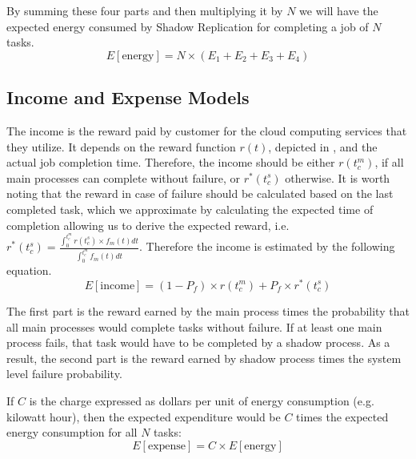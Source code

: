 

By summing these four parts and then multiplying it by $N$ we will have
the expected energy consumed by Shadow Replication for completing a
job of $N$ tasks.
\begin{equation}
E[\text{energy}]=N \times (E_1 + E_2 + E_3 + E_4)
\label{eq:total_energy}
\end{equation}

\subsection{Income and Expense Models}
The income is the reward paid by customer for the cloud computing
services that they utilize. It depends on the reward function $r(t)$,
depicted in , and the actual job completion
time. Therefore, the income should be either $r(t_c^m)$, if all main
processes can complete without failure, or $r^*(t_c^s)$ otherwise. It
is worth noting that the reward in case of failure should be
calculated based on the last completed task, which we approximate by
calculating the expected time of completion allowing us to derive the
expected reward, i.e. $r^*(t_c^s)=\frac{\int_0^{t_c^m}r(t_c^s) \times
f_m(t)dt}{\int_0^{t_c^m}f_m(t)dt}$. Therefore the income is estimated
by the following equation.
\begin{equation}
E[\text{income}]= (1-P_f) \times r(t_c^m) + P_f \times r^*(t_c^s)
\end{equation}


The first part is the reward earned by the main process times the
probability that all main processes would complete tasks without
failure. If at least one main process fails, that task would have to
be completed by a shadow process. As a result, the second part is the
reward earned by shadow process times the system level failure probability.

If $C$ is the charge expressed as dollars per unit of energy consumption
(e.g. kilowatt hour), then the expected expenditure would be $C$ times
the expected energy consumption for all $N$ tasks:
\begin{equation}
E[\text{expense}] = C \times E[\text{energy}]
\label{eq:expense}
\end{equation}

